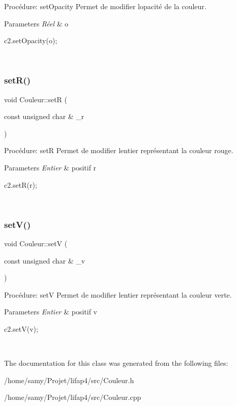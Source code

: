 Procédure\+: set\+Opacity Permet de modifier l\textquotesingle{}opacité de la couleur. 


\begin{DoxyParams}{Parameters}
{\em Réel} & o 
\begin{DoxyCode}
c2.setOpacity(o);
\end{DoxyCode}
 \\
\hline
\end{DoxyParams}
\mbox{\label{classCouleur_aeb7507061466c7c1e18d3b870f876ac0}} 
\subsubsection{\texorpdfstring{set\+R()}{setR()}}
{\footnotesize\ttfamily void Couleur\+::setR (\begin{DoxyParamCaption}\item[{const unsigned char \&}]{\+\_\+r }\end{DoxyParamCaption})}



Procédure\+: setR Permet de modifier l\textquotesingle{}entier représentant la couleur rouge. 


\begin{DoxyParams}{Parameters}
{\em Entier} & positif r 
\begin{DoxyCode}
c2.setR(r);
\end{DoxyCode}
 \\
\hline
\end{DoxyParams}
\mbox{\label{classCouleur_a7aa9a8ce100008ef3551064b1c7bfe47}} 
\subsubsection{\texorpdfstring{set\+V()}{setV()}}
{\footnotesize\ttfamily void Couleur\+::setV (\begin{DoxyParamCaption}\item[{const unsigned char \&}]{\+\_\+v }\end{DoxyParamCaption})}



Procédure\+: setV Permet de modifier l\textquotesingle{}entier représentant la couleur verte. 


\begin{DoxyParams}{Parameters}
{\em Entier} & positif v 
\begin{DoxyCode}
c2.setV(v);
\end{DoxyCode}
 \\
\hline
\end{DoxyParams}


The documentation for this class was generated from the following files\+:\begin{DoxyCompactItemize}
\item 
/home/samy/\+Projet/lifap4/src/Couleur.\+h\item 
/home/samy/\+Projet/lifap4/src/Couleur.\+cpp\end{DoxyCompactItemize}
